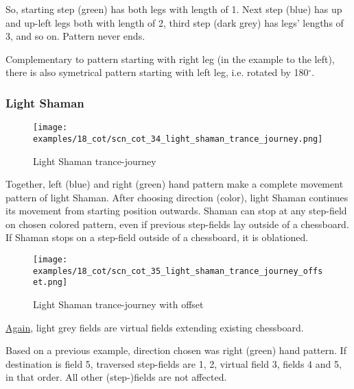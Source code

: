 So, starting step (green) has both legs with length of 1. Next step (blue)
has up and up-left legs both with length of 2, third step (dark grey) has
legs' lengths of 3, and so on. Pattern never ends.

Complementary to pattern starting with right leg (in the example to the
left), there is also symetrical pattern starting with left leg, i.e.
rotated by 180$^{\circ}$. %

\clearpage %

\subsubsection*{Light Shaman}
\label{sec:Conquest of Tlalocan/Trance-journey/Movement/Light Shaman}

\vspace*{-1.4\baselineskip}
\noindent
\begin{figure}[!h]
\texttt{[image: examples/18\_cot/scn\_cot\_34\_light\_shaman\_trance\_journey.png]}
\caption{Light Shaman trance-journey}
\label{fig:scn_cot_34_light_shaman_trance_journey}
\end{figure}

Together, left (blue) and right (green) hand pattern make a complete movement
pattern of light Shaman. After choosing direction (color), light Shaman
continues its movement from starting position outwards. Shaman can stop at
any step-field on chosen colored pattern, even if previous step-fields lay
outside of a chessboard. If Shaman stops on a step-field outside of a
chessboard, it is oblationed.

\clearpage %

\noindent
\begin{figure}[!h]
\texttt{[image: examples/18\_cot/scn\_cot\_35\_light\_shaman\_trance\_journey\_offset.png]}
\caption{Light Shaman trance-journey with offset}
\label{fig:scn_cot_35_light_shaman_trance_journey_offset}
\end{figure}

\hyperref[fig:scn_hd_06_centaur_off_board]{Again},
light grey fields are virtual fields extending existing chessboard.

Based on a previous example, direction chosen was right (green) hand pattern.
If destination is field 5, traversed step-fields are 1, 2, virtual field 3,
fields 4 and 5, in that order. All other (step-)fields are not affected.

